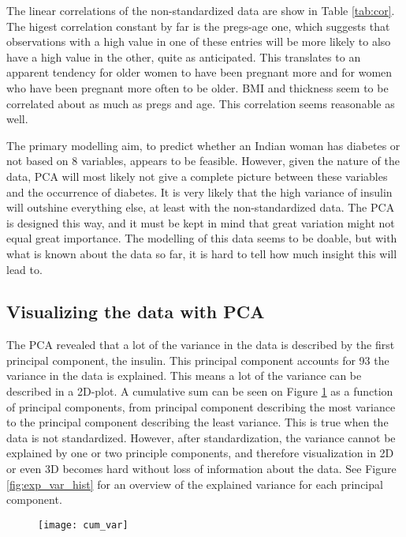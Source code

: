 The linear correlations of the non-standardized data are show in Table \ref{tab:cor}.
The higest correlation constant by far is the pregs-age one, which suggests
that observations with a high value in one of these entries will be more likely
to also have a high value in the other, quite as anticipated. This translates to
an apparent tendency for older women to have been pregnant more and for women
who have been pregnant more often to be older.
BMI and thickness seem to be correlated about as much as pregs and age. This
correlation seems reasonable as well.

The primary modelling aim, to predict whether an Indian woman has diabetes or not
based on 8 variables, appears to be feasible. However, given the nature of the
data, PCA will most likely not give a complete picture between these variables
and the occurrence of diabetes. It is very likely that the high variance of
insulin will outshine everything else, at least with the non-standardized
data. The PCA is designed this way, and it must be kept in mind that great
variation might not equal great importance.
The modelling of this data seems to be doable, but with what is known about the data
so far, it is hard to tell how much insight this will lead to.

\subsection{Visualizing the data with PCA}
The PCA revealed that a lot of the variance in the data is described by the
first principal component, the insulin. This principal component accounts for
93%
the variance in the data is explained. This means a lot of the variance can
be described in a 2D-plot. A cumulative sum can be seen on Figure \ref{fig:cumvar} as a
function of principal components, from principal component describing the most
variance to the principal component describing the least variance. This is true
when the data is not standardized. However, after standardization, the variance
cannot be explained by one or two principle components, and therefore visualization
in 2D or even 3D becomes hard without loss of information about the data. See
Figure \ref{fig:exp_var_hist} for an overview of the explained variance for each principal component.

\begin{figure}
  \centering{}
  \texttt{[image: cum\_var]}
  \label{fig:cumvar}
\end{figure}

